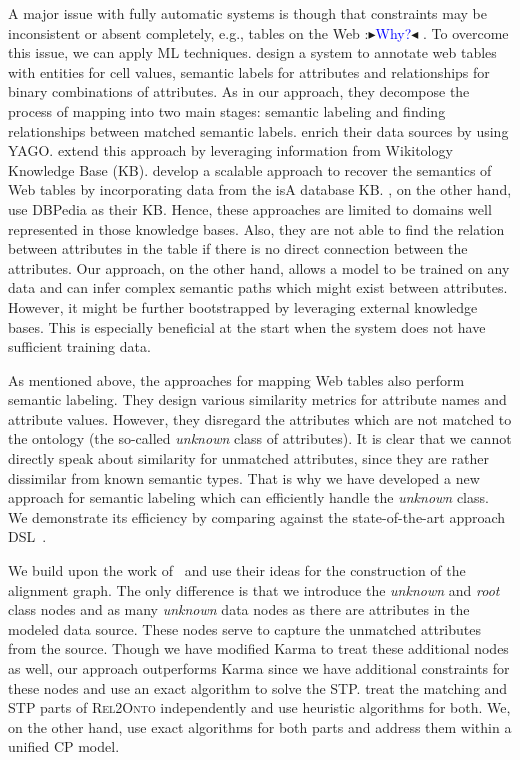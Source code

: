 \documentclass[letterpaper]{article} %
\newcommand{\authornote}[3]{
  {\fbox{\sc 
  #1}:$\blacktriangleright$\textcolor{#2}{\small{#3}}$\blacktriangleleft$}%
}
\newcommand{\ddg}[1]{\authornote{DDG}{blue}{#1}}
\newcommand{\relonto}{\textsc{Rel2Onto}}
\begin{document}
A major issue with fully automatic systems is though that constraints may be inconsistent or absent completely, e.g., tables on the Web \ddg{Why?}.
To overcome this issue, we can apply ML techniques.
\cite{Limaye:Annotating} design a system to annotate web tables with entities for cell values, semantic labels for attributes and relationships for binary combinations of attributes.
As in our approach, they decompose the process of mapping into two main stages: semantic labeling and finding relationships between matched semantic labels.
\cite{Limaye:Annotating} enrich their data sources by using YAGO.
\cite{Mulwad:Semantic} extend this approach by leveraging information from Wikitology Knowledge Base (KB).
\cite{Venetis:Recovering} develop a scalable approach to recover the semantics of Web tables by incorporating data from the isA database KB.
\cite{Ritze:matching}, on the other hand, use DBPedia as their KB.
Hence, these approaches are limited to domains well represented in those knowledge bases.
Also, they are not able to find the relation between attributes in the table if there is no direct connection between the attributes.
Our approach, on the other hand, allows a model to be trained on any data and can infer complex semantic paths which might exist between attributes.
However, it might be further bootstrapped by leveraging external knowledge bases.
This is especially beneficial at the start when the system does not have sufficient training data.

As mentioned above, the approaches for mapping Web tables also perform semantic labeling.
They design various similarity metrics for attribute names and attribute values.
However, they disregard the attributes which are not matched to the ontology (the so-called \emph{unknown} class of attributes).
It is clear that we cannot directly speak about similarity for unmatched attributes, since they are rather dissimilar from known semantic types.
That is why we have developed a new approach for semantic labeling which can efficiently handle the \emph{unknown} class.
We demonstrate its efficiency by comparing against the state-of-the-art approach DSL~\cite{Pham:semantic}.

We build upon the work of~\cite{taheriyan2016learning} and use their ideas for the construction of the alignment graph.
The only difference is that we introduce the \emph{unknown} and \emph{root} class nodes and as many \emph{unknown} data nodes as there are attributes in the modeled data source.
These nodes serve to capture the unmatched attributes from the source.
Though we have modified Karma to treat these additional nodes as well, our approach outperforms Karma since we have additional constraints for these nodes and use an exact algorithm to solve the STP.
\cite{taheriyan2016learning} treat the matching and STP parts of \relonto{} independently and use heuristic algorithms for both.
We, on the other hand, use exact algorithms for both parts and address them within a unified CP model.
\end{document}
